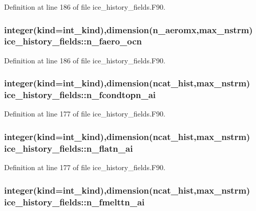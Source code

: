 Definition at line 186 of file ice\_\-history\_\-fields.F90.\hypertarget{namespaceice__history__fields_ae402016c2d3706af277fb399ec8f5ec6}{
\subsubsection[{n\_\-faero\_\-ocn}]{\setlength{\rightskip}{0pt plus 5cm}integer(kind=int\_\-kind),dimension(n\_\-aeromx,max\_\-nstrm) {\bf ice\_\-history\_\-fields::n\_\-faero\_\-ocn}}}
\label{namespaceice__history__fields_ae402016c2d3706af277fb399ec8f5ec6}


Definition at line 186 of file ice\_\-history\_\-fields.F90.\hypertarget{namespaceice__history__fields_a277bf94595092110d32c0719616159fc}{
\subsubsection[{n\_\-fcondtopn\_\-ai}]{\setlength{\rightskip}{0pt plus 5cm}integer(kind=int\_\-kind),dimension({\bf ncat\_\-hist},max\_\-nstrm) {\bf ice\_\-history\_\-fields::n\_\-fcondtopn\_\-ai}}}
\label{namespaceice__history__fields_a277bf94595092110d32c0719616159fc}


Definition at line 177 of file ice\_\-history\_\-fields.F90.\hypertarget{namespaceice__history__fields_aeea32af91b4549502cf55fa0b93f1778}{
\subsubsection[{n\_\-flatn\_\-ai}]{\setlength{\rightskip}{0pt plus 5cm}integer(kind=int\_\-kind),dimension({\bf ncat\_\-hist},max\_\-nstrm) {\bf ice\_\-history\_\-fields::n\_\-flatn\_\-ai}}}
\label{namespaceice__history__fields_aeea32af91b4549502cf55fa0b93f1778}


Definition at line 177 of file ice\_\-history\_\-fields.F90.\hypertarget{namespaceice__history__fields_a950d3a5fcd1b660e07bdea0c7d67cecb}{
\subsubsection[{n\_\-fmelttn\_\-ai}]{\setlength{\rightskip}{0pt plus 5cm}integer(kind=int\_\-kind),dimension({\bf ncat\_\-hist},max\_\-nstrm) {\bf ice\_\-history\_\-fields::n\_\-fmelttn\_\-ai}}}
\label{namespaceice__history__fields_a950d3a5fcd1b660e07bdea0c7d67cecb}


